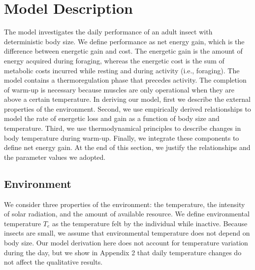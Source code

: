 \section*{Model Description}  %
The model investigates the daily performance of an adult insect with deterministic body size. %
We define performance as net energy gain, which is the difference between energetic gain and cost. %
The energetic gain is the amount of energy acquired during foraging, whereas  the energetic cost is the sum of metabolic costs incurred while resting and during activity (i.e., foraging).
The model contains a thermoregulation phase that precedes activity.
The completion of warm-up is necessary because muscles are only operational when they are above a certain temperature. %
In deriving our model, first we describe the external properties of the environment.
Second, we use empirically derived relationships to model the rate of energetic loss and gain as a function of body size and temperature.
Third, we use thermodynamical principles to describe changes in body temperature during warm-up.
Finally, we integrate these components to define net energy gain. 
At the end of this section, we justify the relationships and the parameter values we adopted.

\subsection*{Environment}
We consider three properties of the environment: the temperature, the intensity of solar radiation, and the amount of available resource.
We define environmental temperature $T_e$ as the temperature felt by the individual while inactive.
Because insects are small, we assume that environmental temperature does not depend on body size. %
Our model derivation here does not account for temperature variation during the day, but we show in Appendix 2 that daily temperature changes do not affect the qualitative results.  %

